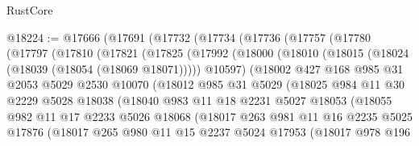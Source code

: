 \begin{lexlean}{RustCore}
\begin{coremodule}
@18224 := @17666
    (@17691
      (@17732
        (@17734
          (@17736
            (@17757
              (@17780
                (@17797
                  (@17810
                    (@17821
                      (@17825
                        (@17992
                          (@18000
                            (@18010 (@18015 (@18024 (@18039 (@18054 (@18069 @18071))))) @10597)
                            (@18002
                              @427
                              @168
                              @985
                              @31
                              @2053
                              @5029
                              @2530
                              @10070
                              (@18012
                                @985
                                @31
                                @5029
                                (@18025
                                  @984
                                  @11
                                  @30
                                  @2229
                                  @5028
                                  @18038
                                  (@18040
                                    @983
                                    @11
                                    @18
                                    @2231
                                    @5027
                                    @18053
                                    (@18055
                                      @982
                                      @11
                                      @17
                                      @2233
                                      @5026
                                      @18068
                                      (@18017
                                        @263
                                        @981
                                        @11
                                        @16
                                        @2235
                                        @5025
                                        @17876
                                        (@18017
                                          @265
                                          @980
                                          @11
                                          @15
                                          @2237
                                          @5024
                                          @17953
                                          (@18017
                                            @978
                                            @196

\end{coremodule}
\end{lexlean}
